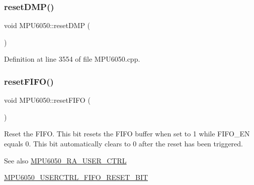 \subsubsection{\texorpdfstring{resetDMP()}{resetDMP()}}
{\footnotesize\ttfamily void M\+P\+U6050\+::reset\+D\+MP (\begin{DoxyParamCaption}{ }\end{DoxyParamCaption})}



Definition at line 3554 of file M\+P\+U6050.\+cpp.


\begin{DoxyCode}{0}

\end{DoxyCode}
\mbox{\label{classMPU6050_aafa0dc38b7ea2acd1aecd5d9df8cbd08}} 
\subsubsection{\texorpdfstring{resetFIFO()}{resetFIFO()}}
{\footnotesize\ttfamily void M\+P\+U6050\+::reset\+F\+I\+FO (\begin{DoxyParamCaption}{ }\end{DoxyParamCaption})}

Reset the F\+I\+FO. This bit resets the F\+I\+FO buffer when set to 1 while F\+I\+F\+O\+\_\+\+EN equals 0. This bit automatically clears to 0 after the reset has been triggered. \begin{DoxySeeAlso}{See also}
\mbox{\hyperlink{MPU6050_8h_acd4c638a6f677a42ecb9a3d7612d087a}{M\+P\+U6050\+\_\+\+R\+A\+\_\+\+U\+S\+E\+R\+\_\+\+C\+T\+RL}} 

\mbox{\hyperlink{MPU6050_8h_ad13b067b38b832477c0139266a863204}{M\+P\+U6050\+\_\+\+U\+S\+E\+R\+C\+T\+R\+L\+\_\+\+F\+I\+F\+O\+\_\+\+R\+E\+S\+E\+T\+\_\+\+B\+IT}} 
\end{DoxySeeAlso}


